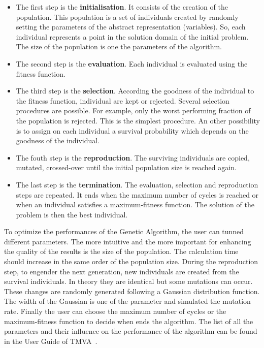 \documentclass[main.tex]{subfiles}
\begin{document}
\begin{itemize}
\item The first step is the \textbf{initialisation}. It consists of the creation of the population. This population is a set of individuals created by randomly setting the parameters of the abstract representation (variables). So, each individual represents a point in the solution domain of the initial problem. The size of the population is one the parameters of the algorithm. 

\item The second step is the \textbf{evaluation}. Each individual is evaluated using the fitness function.

\item The third step is the \textbf{selection}. According the goodness of the individual to the fitness function, individual are kept or rejected. Several selection procedures are possible. For example, only the worst performing fraction of the population is rejected. This is the simplest procedure. An other possibility is to assign on each individual a survival probability which depends on the goodness of the individual.

\item The fouth step is the \textbf{reproduction}. The surviving individuals are copied, mutated, crossed-over until the initial population size is reached again.

\item The last step is the \textbf{termination}. The evaluation, selection and reproduction steps are repeated. It ends when the maximum number of cycles is reached or when an individual satisfies a maximum-fitness function. The solution of the problem is then the best individual. 

\end{itemize}  


\NI To optimize the performances of the Genetic Algorithm, the user can tunned different parameters. The more intuitive and the more important for enhancing the quality of the results is the size of the population. The calculation time should increase in the same order of the population size. During the reproduction step, to engender the next generation, new individuals are created from the survival individuals. In theory they are identical but some mutations can occur. These changes are randomly generated following a Gaussian distribution function. The width of the Gaussian is one of the parameter and simulated the mutation rate. Finally the user can choose the maximum number of cycles or the maximum-fitness function to decide when ends the algorithm. The list of all the parameters and their influence on the performance of the algorithm can be found in the User Guide of TMVA~\cite{TMVA}.
\end{document}

